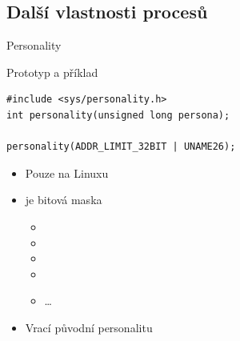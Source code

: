 \subsection*{Další vlastnosti procesů}
\frame{\subsectionpage}

\begin{frame}[fragile]{Personality}

  \begin{block}{Prototyp a příklad}
    \begin{lstlisting}[aboveskip=2pt,belowskip=2pt]
#include <sys/personality.h>
int personality(unsigned long persona);

personality(ADDR_LIMIT_32BIT | UNAME26);
    \end{lstlisting}
  \end{block}

  \begin{itemize}
    \item Pouze na Linuxu

    \pause

    \item {} je bitová maska
    \begin{itemize}
      \item {}
      \item {}
      \item {}
      \item {}
      \item \dots
    \end{itemize}

    \pause

    \item Vrací původní personalitu
  \end{itemize}

\end{frame}


